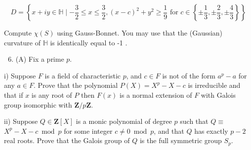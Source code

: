 \documentclass[10pt]{article}
\begin{document}
$$
D=\left\{x+i y \in \mathbb{H} \mid-\frac{3}{2} \leq x \leq \frac{3}{2},(x-c)^{2}+y^{2} \geq \frac{1}{9} \text { for } c \in\left\{ \pm \frac{1}{3}, \pm \frac{2}{3}, \pm \frac{4}{3}\right\}\right\}
$$

Compute $\chi(S)$ using Gauss-Bonnet. You may use that the (Gaussian) curvature of $\mathbb{H}$ is identically equal to -1 .

\begin{enumerate}
  \setcounter{enumi}{5}
  \item (A) Fix a prime $p$.
\end{enumerate}

i) Suppose $F$ is a field of characteristic $p$, and $c \in F$ is not of the form $a^{p}-a$ for any $a \in F$. Prove that the polynomial $P(X)=X^{p}-X-c$ is irreducible and that if $x$ is any root of $P$ then $F(x)$ is a normal extension of $F$ with Galois group isomorphic with $\mathbf{Z} / p \mathbf{Z}$.

ii) Suppose $Q \in \mathbf{Z}[X]$ is a monic polynomial of degree $p$ such that $Q \equiv$ $X^{p}-X-c \bmod p$ for some integer $c \neq 0 \bmod p$, and that $Q$ has exactly $p-2$ real roots. Prove that the Galois group of $Q$ is the full symmetric group $S_{p}$.
\end{document}
